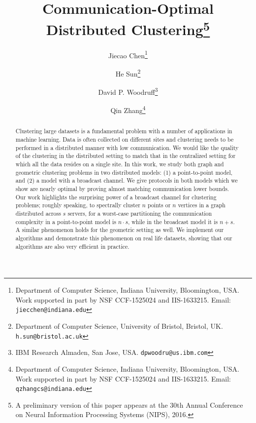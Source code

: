 \documentclass[11pt,letter]{article}
\title{\textbf{Communication-Optimal Distributed Clustering}\footnote{A preliminary version of this paper appears at the 30th
Annual Conference on Neural Information Processing Systems (NIPS), 2016.}}
\author{
  Jiecao Chen\footnote{Department of Computer Science, Indiana University, Bloomington,  USA.  Work supported in part by NSF
CCF-1525024 and IIS-1633215.
  Email: \texttt{jiecchen@indiana.edu}}
 \and
  He Sun\footnote{Department of Computer Science, University of Bristol, Bristol,  UK.
 \texttt{h.sun@bristol.ac.uk}} 
\and
   David P. Woodruff\footnote{IBM Research Almaden, San Jose,  USA. \texttt{dpwoodru@us.ibm.com}}
   \and
   Qin Zhang\footnote{Department of Computer Science, Indiana University, Bloomington, USA. Work supported in part by NSF
CCF-1525024 and IIS-1633215.
 Email: \texttt{qzhangcs@indiana.edu}}
}
\date{}
\begin{document}

\maketitle

\begin{abstract}
Clustering large datasets is a fundamental problem with a number of applications in machine learning. Data is often collected on different sites and clustering needs to be performed in a distributed manner with low communication. We would like the quality of the clustering in the distributed setting to match that in the centralized setting for which all the data resides on a single site. In this work, we study both graph and geometric clustering problems in two distributed models: (1) a point-to-point model, and (2) a model with a broadcast channel. We give protocols in both models which we show are nearly optimal by proving almost matching communication lower bounds. Our work highlights the surprising power of a broadcast channel for clustering problems; roughly speaking, to spectrally cluster $n$ points or $n$ vertices in a graph distributed across $s$ servers, for a worst-case partitioning the communication complexity in a point-to-point model is $n \cdot s$, while in the broadcast model it is $n + s$. A similar phenomenon holds for the geometric setting as well. We implement our algorithms and demonstrate this phenomenon on real life datasets, showing that our algorithms are also very efficient in practice. 
\end{abstract}
\end{document}
